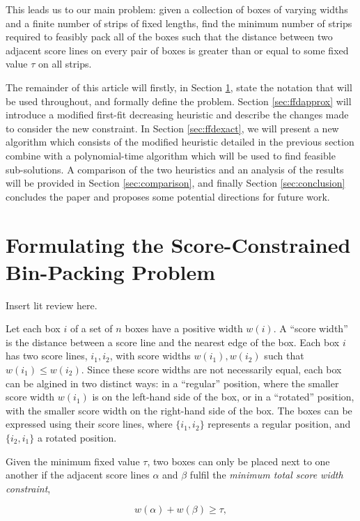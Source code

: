 \documentclass[oribibl]{llncs}
\begin{document}
This leads us to our main problem: given a collection of boxes of varying widths and a finite number of strips of fixed lengths, find the minimum number of strips required to feasibly pack all of the boxes such that the distance between two adjacent score lines on every pair of boxes is greater than or equal to some fixed value $\tau$ on all strips.

The remainder of this article will firstly, in Section \ref{sec:scbpp}, state the notation that will be used throughout, and formally define the problem. Section \ref{sec:ffdapprox} will introduce a modified first-fit decreasing heuristic and describe the changes made to consider the new constraint. In Section \ref{sec:ffdexact}, we will present a new algorithm which consists of the modified heuristic detailed in the previous section combine with a polynomial-time algorithm which will be used to find feasible sub-solutions. A comparison of the two heuristics and an analysis of the results will be provided in Section \ref{sec:comparison}, and finally Section \ref{sec:conclusion} concludes the paper and proposes some potential directions for future work.

\section{Formulating the Score-Constrained Bin-Packing Problem}
\label{sec:scbpp}
Insert lit review here.

Let each box $i$ of a set of $n$ boxes have a positive width $w(i)$. A ``score width'' is the distance between a score line and the nearest edge of the box. Each box $i$ has two score lines, $i_1, i_2$, with score widths $w(i_1), w(i_2)$ such that $w(i_1) \leq w(i_2)$. Since these score widths are not necessarily equal, each box can be algined in two distinct ways: in a ``regular'' position, where the smaller score width $w(i_1)$ is on the left-hand side of the box, or in a ``rotated'' position, with the smaller score width on the right-hand side of the box. The boxes can be expressed using their score lines, where $\{i_1, i_2\}$ represents a regular position, and $\{i_2, i_1\}$ a rotated position. 

Given the minimum fixed value $\tau$, two boxes can only be placed next to one another if the adjacent score lines $\alpha$ and $\beta$ fulfil the \textit{minimum total score width constraint},

\begin{equation*}
	\label{eqn:mtswc}
	w(\alpha) + w(\beta) \geq \tau,
\end{equation*}
\end{document}
